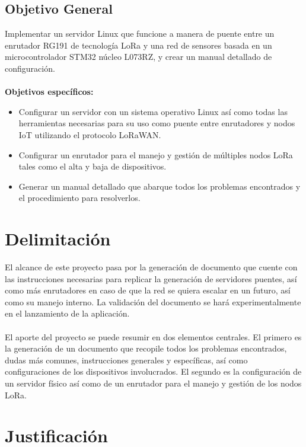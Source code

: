  \subsection{Objetivo General}
Implementar un servidor Linux que funcione a manera de puente entre un enrutador RG191 de tecnología
LoRa y una red de sensores basada en un microcontrolador STM32 núcleo L073RZ, y crear un manual
detallado de configuración. \\
\\
 \textbf{Objetivos específicos:}
 \begin{itemize}
  \item Configurar un servidor con un sistema operativo Linux así como todas las herramientas necesarias para su uso como puente entre enrutadores y nodos IoT utilizando el protocolo LoRaWAN. 
  \item Configurar un enrutador para el manejo y gestión de múltiples nodos LoRa tales como el alta y baja de dispositivos.
  \item Generar un manual detallado que abarque todos los problemas encontrados y el procedimiento para resolverlos.
\end{itemize}

\section{Delimitación } \label{delimitacioninvestigacion}

El alcance de este proyecto pasa por la generación de documento que cuente con las instrucciones
necesarias para replicar la generación de servidores puentes, así como más enrutadores en caso de
que la red se quiera escalar en un futuro, así como su manejo interno. La validación del documento
se hará experimentalmente en el lanzamiento de la aplicación.
\\
\\
El aporte del proyecto se puede resumir en dos elementos centrales. El primero es la generación de
un documento que recopile todos los problemas encontrados, dudas más comunes, instrucciones
generales y específicas, así como configuraciones de los dispositivos involucrados. El segundo es la
configuración de un servidor físico así como de un enrutador para el manejo y gestión de los nodos
\Gls{LoRa}.

\section{Justificación} \label{justificacion}

